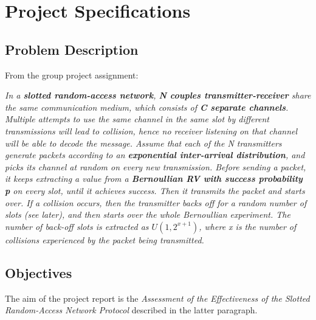 \section{Project Specifications}


\subsection{Problem Description}
From the group project assignment:
\vspace{0.4cm}

\textit{In a \textbf{slotted random-access network}, \textbf{N couples transmitter-receiver} share the same communication
medium, which consists of \textbf{C separate channels}. Multiple attempts to use the same channel in the
same slot by different transmissions will lead to collision, hence no receiver listening on that
channel will be able to decode the message.
Assume that each o\underline{}f the N transmitters generate packets according to an \textbf{exponential inter-arrival
distribution}, and picks its channel at random on every new transmission. Before sending a packet, it
keeps extracting a value from a \textbf{Bernoullian RV with success probability p} on every slot, until it
achieves success. Then it transmits the packet and starts over. If a collision occurs, then the
transmitter backs off for a random number of slots (see later), and then starts over the whole
Bernoullian experiment.
The number of back-off slots is extracted as $U(1, 2^{x+1})$, where x is the number of collisions
experienced by the packet being transmitted.}
\subsection{Objectives}
The aim of the project report is the \textit{Assessment of the Effectiveness of the Slotted Random-Access Network Protocol} described in the latter paragraph.
